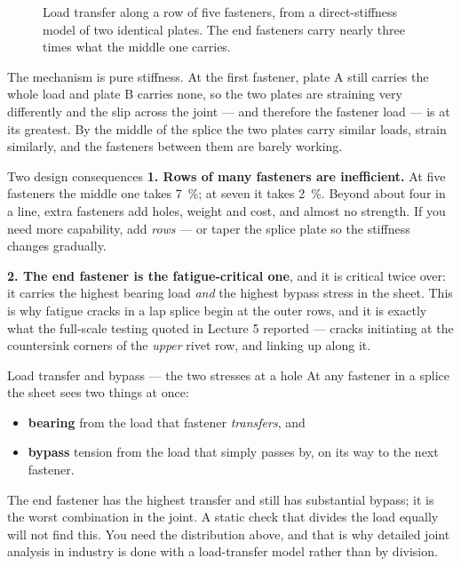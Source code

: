 \documentclass[11pt,a4paper]{article}
\begin{document}
\begin{figure}[H]\centering
\resizebox{0.95\textwidth}{!}{}
\caption{Load transfer along a row of five fasteners, from a direct-stiffness model of two
identical plates. The end fasteners carry nearly three times what the middle one carries.}
\label{fig:row}
\end{figure}

The mechanism is pure stiffness. At the first fastener, plate A still carries the whole load and
plate B carries none, so the two plates are straining very differently and the slip across the
joint --- and therefore the fastener load --- is at its greatest. By the middle of the splice the
two plates carry similar loads, strain similarly, and the fasteners between them are barely working.

\begin{keybox}{Two design consequences}
\textbf{1. Rows of many fasteners are inefficient.} At five fasteners the middle one takes
\SI{7}{\percent}; at seven it takes \SI{2}{\percent}. Beyond about four in a line, extra fasteners
add holes, weight and cost, and almost no strength. If you need more capability, add \emph{rows}
--- or taper the splice plate so the stiffness changes gradually.

\medskip
\textbf{2. The end fastener is the fatigue-critical one}, and it is critical twice over: it carries
the highest bearing load \emph{and} the highest bypass stress in the sheet. This is why fatigue
cracks in a lap splice begin at the outer rows, and it is exactly what the full-scale testing
quoted in Lecture 5 reported --- cracks initiating at the countersink corners of the \emph{upper}
rivet row, and linking up along it.
\end{keybox}

\begin{aerobox}{Load transfer and bypass --- the two stresses at a hole}
At any fastener in a splice the sheet sees two things at once:
\begin{itemize}[leftmargin=*,nosep]
\item \textbf{bearing} from the load that fastener \emph{transfers}, and
\item \textbf{bypass} tension from the load that simply passes by, on its way to the next fastener.
\end{itemize}
The end fastener has the highest transfer and still has substantial bypass; it is the worst
combination in the joint. A static check that divides the load equally will not find this. You need
the distribution above, and that is why detailed joint analysis in industry is done with a
load-transfer model rather than by division.
\end{aerobox}
\end{document}
